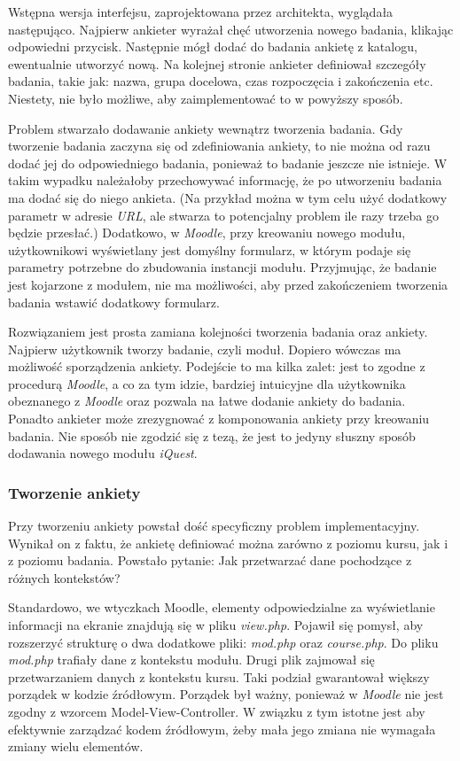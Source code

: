 Wstępna wersja interfejsu, zaprojektowana przez architekta, wyglądała następująco. Najpierw ankieter wyrażał chęć utworzenia nowego badania, klikając odpowiedni przycisk. Następnie mógł dodać do badania ankietę z katalogu, ewentualnie utworzyć nową. Na kolejnej stronie ankieter definiował szczegóły badania, takie jak: nazwa, grupa docelowa, czas rozpoczęcia i zakończenia etc. Niestety, nie było możliwe, aby zaimplementować to w powyższy sposób.

Problem stwarzało dodawanie ankiety wewnątrz tworzenia badania. Gdy tworzenie badania zaczyna się od zdefiniowania ankiety, to nie można od razu dodać jej do odpowiedniego badania, ponieważ to badanie jeszcze nie istnieje. W takim wypadku należałoby przechowywać informację, że po utworzeniu badania ma dodać się do niego ankieta. (Na przykład można w tym celu użyć dodatkowy parametr w adresie \emph{URL}, ale stwarza to potencjalny problem ile razy trzeba go będzie przesłać.) Dodatkowo, w \emph{Moodle}, przy kreowaniu nowego modułu, użytkownikowi wyświetlany jest domyślny formularz, w którym podaje się parametry potrzebne do zbudowania instancji modułu. Przyjmując, że badanie jest kojarzone z modułem, nie ma możliwości, aby przed zakończeniem tworzenia badania wstawić dodatkowy formularz.

Rozwiązaniem jest prosta zamiana kolejności tworzenia badania oraz ankiety. Najpierw użytkownik tworzy badanie, czyli moduł. Dopiero wówczas ma możliwość sporządzenia ankiety. Podejście to ma kilka zalet: jest to zgodne z procedurą \emph{Moodle}, a co za tym idzie, bardziej intuicyjne dla użytkownika obeznanego z \emph{Moodle} oraz pozwala na łatwe dodanie ankiety do badania. Ponadto ankieter może zrezygnować z komponowania ankiety przy kreowaniu badania. Nie sposób nie zgodzić się z tezą, że jest to jedyny słuszny sposób dodawania nowego modułu \emph{iQuest}.

\subsubsection{Tworzenie ankiety}
Przy tworzeniu ankiety powstał dość specyficzny problem implementacyjny. Wynikał on z faktu, że ankietę definiować można zarówno z poziomu kursu, jak i z poziomu badania. Powstało pytanie: Jak przetwarzać dane pochodzące z różnych kontekstów? 

Standardowo, we wtyczkach Moodle, elementy odpowiedzialne za wyświetlanie informacji na ekranie znajdują się w pliku \emph{view.php}. Pojawił się pomysł, aby rozszerzyć strukturę o dwa dodatkowe pliki: \emph{mod.php} oraz \emph{course.php}. Do pliku \emph{mod.php} trafiały dane z kontekstu modułu. Drugi plik zajmował się przetwarzaniem danych z kontekstu kursu. Taki podział gwarantował większy porządek w kodzie źródłowym. Porządek był ważny, ponieważ w \emph{Moodle} nie jest zgodny z wzorcem Model-View-Controller. W związku z tym istotne jest aby efektywnie zarządzać kodem źródłowym, żeby mała jego zmiana nie wymagała zmiany wielu elementów.

